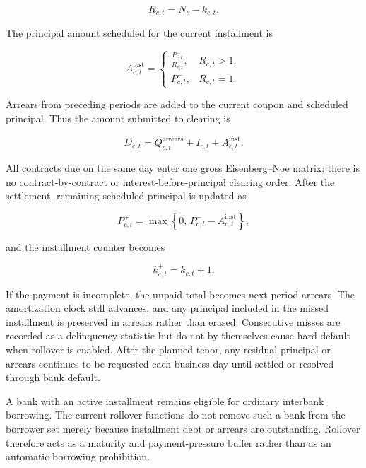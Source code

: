\begin{equation}
R_{c,t}=N_c-k_{c,t}.
\label{eq:remaining_periods}
\end{equation}

The principal amount scheduled for the current installment is

\begin{equation}
A_{c,t}^{\mathrm{inst}}
=
\begin{cases}
\displaystyle \frac{P_{c,t}^{-}}{R_{c,t}}, & R_{c,t}>1,\\[6pt]
P_{c,t}^{-}, & R_{c,t}=1.
\end{cases}
\label{eq:installment_principal}
\end{equation}

Arrears from preceding periods are added to the current coupon and
scheduled principal. Thus the amount submitted to clearing is

\begin{equation}
D_{c,t}=Q_{c,t}^{\mathrm{arrears}}+I_{c,t}+A_{c,t}^{\mathrm{inst}}.
\label{eq:contract_due_payment}
\end{equation}

All contracts due on the same day enter one gross Eisenberg--Noe matrix;
there is no contract-by-contract or interest-before-principal clearing
order. After the settlement, remaining scheduled principal is updated as

\begin{equation}
P_{c,t}^{+}
=
\max\left\{0,\,P_{c,t}^{-}-A_{c,t}^{\mathrm{inst}}\right\},
\label{eq:remaining_principal}
\end{equation}

and the installment counter becomes

\begin{equation}
k_{c,t}^{+}=k_{c,t}+1.
\label{eq:period_update}
\end{equation}

If the payment is incomplete, the unpaid total becomes next-period
arrears. The amortization clock still advances, and any principal included
in the missed installment is preserved in arrears rather than erased.
Consecutive misses are recorded as a delinquency statistic but do not by
themselves cause hard default when rollover is enabled. After the planned
tenor, any residual principal or arrears continues to be requested each
business day until settled or resolved through bank default.

A bank with an active installment remains eligible for ordinary
interbank borrowing. The current rollover functions do not remove such a
bank from the borrower set merely because installment debt or arrears are
outstanding. Rollover therefore acts as a maturity and payment-pressure
buffer rather than as an automatic borrowing prohibition.

